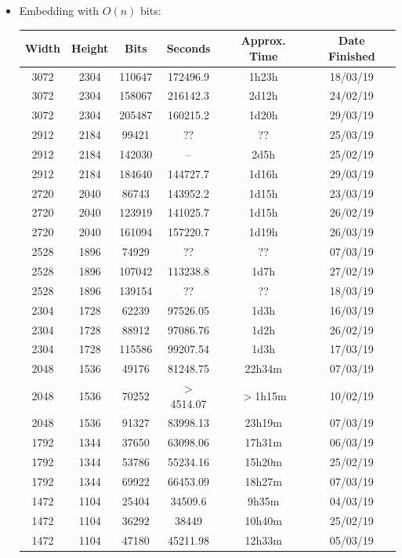 \documentclass[11pt,a4paper]{report}
\begin{document}
\begin{itemize}
\newpage
\item Embedding with $O(n)$ bits:
  \begin{center}
  \begin{tabular}{ c c c | c c c }
  Width & Height & Bits & Seconds & Approx. Time & Date Finished \\ \hline
  3072 & 2304 & 110647 & 172496.9 & 1h23h & 18/03/19 \\
  3072 & 2304 & 158067 & 216142.3 & 2d12h & 24/02/19 \\
  3072 & 2304 & 205487 & 160215.2 & 1d20h & 29/03/19 \\
  2912 & 2184 & 99421 & ?? & ?? & 25/03/19 \\ %
  2912 & 2184 & 142030 & -- & 2d5h & 25/02/19 \\
  2912 & 2184 & 184640 & 144727.7 & 1d16h & 29/03/19 \\
  2720 & 2040 & 86743 & 143952.2 & 1d15h & 23/03/19 \\
  2720 & 2040 & 123919 & 141025.7 & 1d15h & 26/02/19 \\
  2720 & 2040 & 161094 & 157220.7 & 1d19h & 26/03/19 \\
  2528 & 1896 & 74929 & ?? & ?? & 07/03/19 \\ %
  2528 & 1896 & 107042 & 113238.8 & 1d7h & 27/02/19 \\
  2528 & 1896 & 139154 & ?? & ?? & 18/03/19 \\ %
  2304 & 1728 & 62239 & 97526.05 & 1d3h & 16/03/19 \\
  2304 & 1728 & 88912 & 97086.76 & 1d2h & 26/02/19 \\
  2304 & 1728 & 115586 & 99207.54 & 1d3h & 17/03/19 \\
  2048 & 1536 & 49176 & 81248.75 & 22h34m & 07/03/19 \\
  2048 & 1536 & 70252 & $>$4514.07 & $>$1h15m & 10/02/19 \\
  2048 & 1536 & 91327 & 83998.13 & 23h19m & 07/03/19 \\
  1792 & 1344 & 37650 & 63098.06 & 17h31m & 06/03/19 \\
  1792 & 1344 & 53786 & 55234.16 & 15h20m & 25/02/19 \\
  1792 & 1344 & 69922 & 66453.09 & 18h27m & 07/03/19 \\
  1472 & 1104 & 25404 & 34509.6 & 9h35m & 04/03/19 \\
  1472 & 1104 & 36292 & 38449 & 10h40m & 25/02/19 \\
  1472 & 1104 & 47180 & 45211.98 & 12h33m & 05/03/19 \\

\end{tabular}
\end{center}
\end{itemize}
\end{document}
